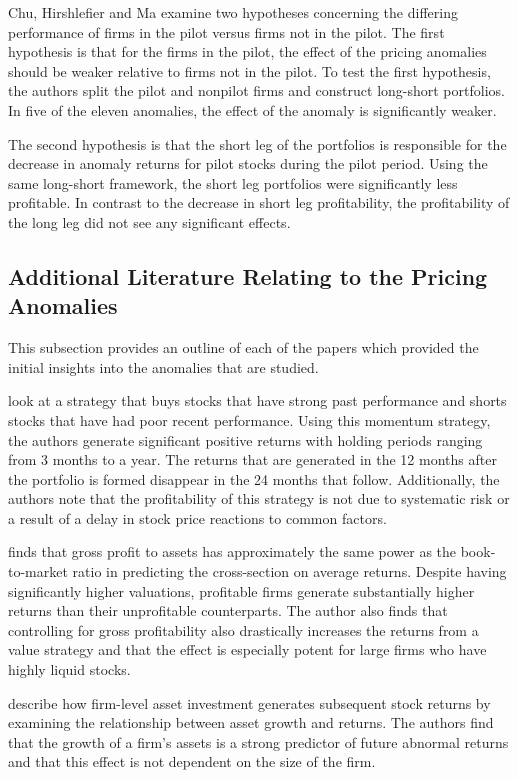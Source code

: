 \documentclass[12pt, a4paper, oneside]{article}
\begin{document}
Chu, Hirshlefier and Ma examine two hypotheses concerning the differing performance of firms in the pilot versus firms not in the pilot. The first hypothesis is that for the firms in the pilot, the effect of the pricing anomalies should be weaker relative to firms not in the pilot. To test the first hypothesis, the authors split the pilot and nonpilot firms and construct long-short portfolios. In five of the eleven anomalies, the effect of the anomaly is significantly weaker.

The second hypothesis is that the short leg of the portfolios is responsible for the decrease in anomaly returns for pilot stocks during the pilot period. Using the same long-short framework, the short leg portfolios were significantly less profitable. In contrast to the decrease in short leg profitability, the profitability of the long leg did not see any significant effects.

\subsection{Additional Literature Relating to the Pricing Anomalies}
This subsection provides an outline of each of the papers which provided the initial insights into the anomalies that are studied.

 look at a strategy that buys stocks that have strong past performance and shorts stocks that have had poor recent performance. Using this momentum strategy, the authors generate significant positive returns with holding periods ranging from 3 months to a year. The returns that are generated in the 12 months after the portfolio is formed disappear in the 24 months that follow. Additionally, the authors note that the profitability of this strategy is not due to systematic risk or a result of a delay in stock price reactions to common factors. 

 finds that gross profit to assets has approximately the same power as the book-to-market ratio in predicting the cross-section on average returns. Despite having significantly higher valuations, profitable firms generate substantially higher returns than their unprofitable counterparts. The author also finds that controlling for gross profitability also drastically increases the returns from a value strategy and that the effect is especially potent for large firms who have highly liquid stocks. 

 describe how firm-level asset investment generates subsequent stock returns by examining the relationship between asset growth and returns. The authors find that the growth of a firm's assets is a strong predictor of future abnormal returns and that this effect is not dependent on the size of the firm. 
\end{document}
